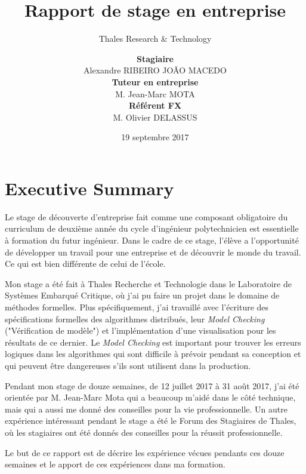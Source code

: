 \documentclass[a4paper, 12pt]{article} %
\begin{document}
\title{Rapport de stage en entreprise}
\subtitle{Thales Research \& Technology}
\author{
\begin{tabular}{ccc}
	\textbf{Stagiaire}
	\\
	Alexandre RIBEIRO JOÃO MACEDO
	\\	
	\textbf{Tuteur en entreprise} 
	\\
	M. Jean-Marc MOTA
	\\
	\textbf{Référent FX}
	\\
	M. Olivier DELASSUS
\end{tabular}
}
\date{19 septembre 2017}
\maketitle

\section*{Executive Summary}
Le stage de découverte d'entreprise fait comme une composant obligatoire du curriculum de deuxième année du cycle d'ingénieur polytechnicien est essentielle à formation du futur ingénieur. Dans le cadre de ce stage, l'élève a l'opportunité de développer un travail pour une entreprise et de découvrir le monde du travail. Ce qui est bien différente de celui de l'école.

Mon stage a été fait à Thales Recherche et Technologie dans le Laboratoire de Systèmes Embarqué Critique, où j'ai pu faire un projet dans le domaine de méthodes formelles. Plus spécifiquement, j'ai travaillé avec l'écriture des spécifications formelles des algorithmes distribués, leur \textit{Model Checking} ("Vérification de modèle") et l'implémentation d'une visualisation pour les résultats de ce dernier. Le \textit{Model Checking} est important pour trouver les erreurs logiques dans les algorithmes qui sont difficile à prévoir pendant sa conception et qui peuvent être dangereuses s'ils sont utilisent dans la production.

Pendant mon stage de douze semaines, de 12 juillet 2017 à 31 août 2017, j'ai été orientée par M. Jean-Marc Mota qui a beaucoup m'aidé dans le côté technique, mais qui a aussi me donné des conseilles pour la vie professionnelle. Un autre expérience intéressant pendant le stage a été le Forum des Stagiaires de Thales, où les stagiaires ont été donnés des conseilles pour la réussit professionnelle.

Le but de ce rapport est de décrire les expérience vécues pendants ces douze semaines et le apport de ces expériences dans ma formation.
\end{document}
